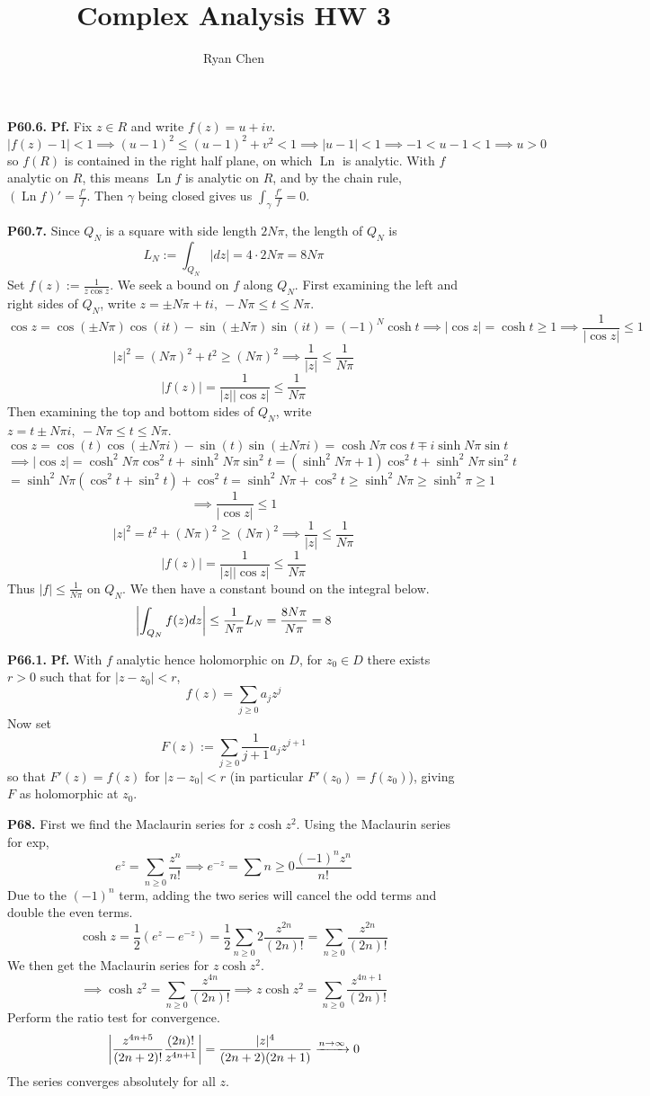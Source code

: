 \documentclass{article}
\title{Complex Analysis HW 3}
\author{Ryan Chen}
\def\tbf#1{\textbf{#1}}
\newcommand{\pf}{\tbf{Pf. }}
\newcommand{\imp}{\implies}
\newcommand{\sep}[1][.5cm]{\vspace{#1}}
\DeclareMathOperator{\Ln}{Ln}
\begin{document}
	
\maketitle



\tbf{P60.6.} \pf Fix $z\in R$ and write $f(z)=u+iv$.
$$|f(z) - 1| < 1 \imp (u-1)^2 \le (u-1)^2 + v^2 < 1
\imp |u - 1| < 1
\imp -1 < u - 1 < 1
\imp u > 0$$
so $f(R)$ is contained in the right half plane, on which $\Ln$ is analytic. With $f$ analytic on $R$, this means $\Ln f$ is analytic on $R$, and by the chain rule, $(\Ln f)'=\frac{f'}{f}$. Then $\gamma$ being closed gives us $\int_\gamma\frac{f'}{f}=0$.
\sep


\tbf{P60.7.} Since $Q_N$ is a square with side length $2N\pi$, the length of $Q_N$ is
$$L_N := \int_{Q_N}|dz| = 4 \cdot 2N\pi = 8N\pi$$
Set $f(z):=\frac1{z\cos z}$. We seek a bound on $f$ along $Q_N$. First examining the left and right sides of $Q_N$, write $z=\pm N\pi+ti,~-N\pi\le t\le N\pi$.
$$\cos z = \cos(\pm N\pi)\cos(it) - \sin(\pm N\pi)\sin(it) = (-1)^N\cosh t
\imp |\cos z| = \cosh t \ge 1
\imp \frac{1}{|\cos z|} \le 1$$
$$|z|^2 = (N\pi)^2 + t^2 \ge (N\pi)^2
\imp \frac{1}{|z|} \le \frac{1}{N\pi}$$
$$|f(z)| = \frac{1}{|z||\cos z|} \le \frac{1}{N\pi}$$
Then examining the top and bottom sides of $Q_N$, write $z=t\pm N\pi i,~-N\pi\le t\le N\pi$.
$$\cos z = \cos(t)\cos(\pm N\pi i) - \sin(t)\sin(\pm N\pi i) = \cosh N\pi\cos t \mp i\sinh N\pi \sin t $$
$$\imp |\cos z| = \cosh^2N\pi \cos^2t + \sinh^2N\pi \sin^2t
= (\sinh^2N\pi + 1)\cos^2t + \sinh^2N\pi \sin^2t$$
$$= \sinh^2N\pi(\cos^2t + \sin^2t) + \cos^2t
= \sinh^2N\pi+ \cos^2t
\ge \sinh^2N\pi
\ge \sinh^2\pi
\ge 1$$
$$\imp \frac{1}{|\cos z|} \le 1$$
$$|z|^2 = t^2 + (N\pi)^2 \ge (N\pi)^2 \imp \frac{1}{|z|} \le \frac{1}{N\pi}$$
$$|f(z)| = \frac{1}{|z||\cos z|} \le \frac{1}{N\pi}$$
Thus $|f|\le \frac{1}{N\pi}$ on $Q_N$. We then have a constant bound on the integral below.
$$\abs{\int_{Q_N}f(z)dz} \le \frac{1}{N\pi}L_N = \frac{8N\pi}{N\pi} = 8$$
\sep



\tbf{P66.1.} \pf With $f$ analytic hence holomorphic on $D$, for $z_0\in D$ there exists $r>0$ such that for $|z-z_0|<r$,
$$f(z) = \sum_{j\ge0}a_jz^j$$
Now set
$$F(z) := \sum_{j\ge0}\frac{1}{j+1}a_jz^{j+1}$$
so that $F'(z)=f(z)$ for $|z-z_0|<r$ (in particular $F'(z_0)=f(z_0)$), giving $F$ as holomorphic at $z_0$.
\sep



\tbf{P68.} First we find the Maclaurin series for $z\cosh z^2$. Using the Maclaurin series for exp,
$$e^z = \sum_{n\ge0}\frac{z^n}{n!} \imp e^{-z} = \sum{n\ge0}\frac{(-1)^nz^n}{n!}$$
Due to the $(-1)^n$ term, adding the two series will cancel the odd terms and double the even terms.
$$\cosh z = \frac12(e^z - e^{-z}) = \frac12\sum_{n\ge0}2\frac{z^{2n}}{(2n)!} = \sum_{n\ge0}\frac{z^{2n}}{(2n)!}$$
We then get the Maclaurin series for $z\cosh z^2$.
$$\imp \cosh z^2 = \sum_{n\ge0}\frac{z^{4n}}{(2n)!}
\imp \boxed{z\cosh z^2 = \sum_{n\ge0}\frac{z^{4n+1}}{(2n)!}}$$
Perform the ratio test for convergence.
$$\abs{\frac{z^{4n+5}}{(2n+2)!} \frac{(2n)!}{z^{4n+1}}} = \frac{|z|^4}{(2n+2)(2n+1)} \app[n][\infty] 0$$
The series converges absolutely for all $z$.\\
\end{document}
